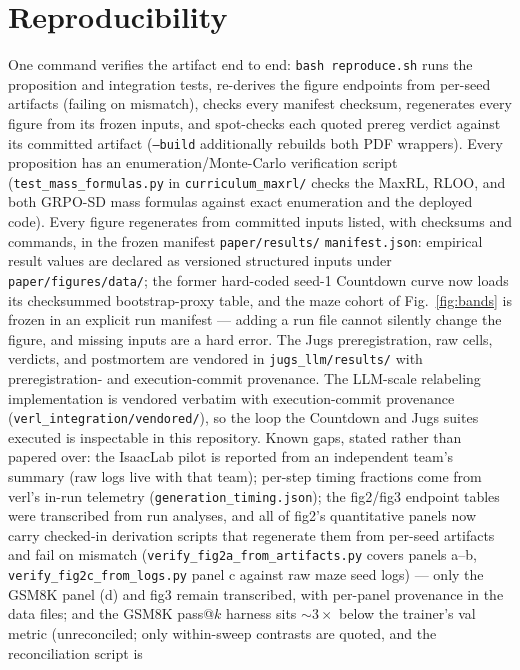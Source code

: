 \section*{Reproducibility}
One command verifies the artifact end to end:
\texttt{bash reproduce.sh} runs the proposition and integration
tests, re-derives the figure endpoints from per-seed artifacts
(failing on mismatch), checks every manifest checksum, regenerates
every figure from its frozen inputs, and spot-checks each quoted
prereg verdict against its committed artifact
(\texttt{--build} additionally rebuilds both PDF wrappers).
Every proposition has an enumeration/Monte-Carlo verification script
(\texttt{test\_mass\_formulas.py} in \texttt{curriculum\_maxrl/}
checks the MaxRL, RLOO, and both GRPO-SD mass formulas against exact
enumeration and the deployed code). Every figure regenerates from committed inputs listed,
with checksums and commands, in the frozen manifest
\texttt{paper/results/} \texttt{manifest.json}:
empirical result values are declared as versioned structured inputs under
\texttt{paper/figures/data/}; the former hard-coded seed-1 Countdown curve now
loads its checksummed bootstrap-proxy table,
and the maze cohort of Fig.~\ref{fig:bands} is frozen in an explicit
run manifest --- adding a run file cannot silently change the figure,
and missing inputs are a hard error. The Jugs preregistration, raw
cells, verdicts, and postmortem are vendored in
\texttt{jugs\_llm/results/} with preregistration- and execution-commit
provenance. The LLM-scale relabeling implementation is vendored
verbatim with execution-commit provenance
(\texttt{verl\_integration/vendored/}), so the loop the Countdown and
Jugs suites executed is inspectable in this repository. Known gaps,
stated rather than papered over: the IsaacLab
pilot is reported from an independent team's summary (raw logs live
with that team); per-step timing fractions come from verl's in-run
telemetry (\texttt{generation\_timing.json}); the fig2/fig3 endpoint
tables were transcribed from run analyses, and all of fig2's
quantitative panels now carry checked-in derivation scripts that
regenerate them from per-seed artifacts and fail on mismatch
(\texttt{verify\_fig2a\_from\_artifacts.py} covers panels a--b,
\texttt{verify\_fig2c\_from\_logs.py} panel c against raw maze seed
logs) --- only the GSM8K panel (d) and fig3 remain transcribed, with
per-panel provenance in the data files; and
the GSM8K pass@$k$ harness sits
${\sim}3\times$ below the trainer's val metric (unreconciled; only
within-sweep contrasts are quoted, and the reconciliation script is
